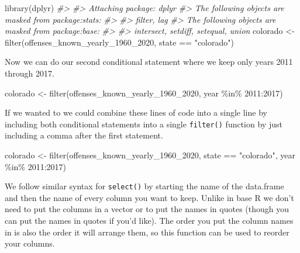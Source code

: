 \documentclass[
]{krantz}
\makeatletter
\newenvironment{Shaded}{\begin{snugshade}}{\end{snugshade}}
\newcommand{\CommentTok}[1]{\textcolor[rgb]{0.37,0.37,0.37}{\textit{#1}}}
\newcommand{\DecValTok}[1]{\textcolor[rgb]{0.06,0.06,0.06}{#1}}
\newcommand{\FunctionTok}[1]{\textcolor[rgb]{0,0,0}{#1}}
\newcommand{\NormalTok}[1]{#1}
\newcommand{\OtherTok}[1]{\textcolor[rgb]{0.37,0.37,0.37}{#1}}
\newcommand{\SpecialCharTok}[1]{\textcolor[rgb]{0,0,0}{#1}}
\newcommand{\StringTok}[1]{\textcolor[rgb]{0.5,0.5,0.5}{#1}}
\newenvironment{kframe}{%
\medskip{}
\setlength{\fboxsep}{.8em}
 \def\at@end@of@kframe{}%
 \ifinner\ifhmode%
  \def\at@end@of@kframe{\end{minipage}}%
  \begin{minipage}{\columnwidth}%
 \fi\fi%
 \def\FrameCommand##1{\hskip\@totalleftmargin \hskip-\fboxsep
 \colorbox{shadecolor}{##1}\hskip-\fboxsep
     \hskip-\linewidth \hskip-\@totalleftmargin \hskip\columnwidth}%
 \MakeFramed {\advance\hsize-\width
   \@totalleftmargin\z@ \linewidth\hsize
   \@setminipage}}%
 {\par\unskip\endMakeFramed%
 \at@end@of@kframe}
\renewenvironment{Shaded}{\begin{kframe}}{\end{kframe}}
\makeatother
\begin{document}
\begin{Shaded}
\begin{Highlighting}[]
\FunctionTok{library}\NormalTok{(dplyr)}
\CommentTok{\#\textgreater{} }
\CommentTok{\#\textgreater{} Attaching package: \textquotesingle{}dplyr\textquotesingle{}}
\CommentTok{\#\textgreater{} The following objects are masked from \textquotesingle{}package:stats\textquotesingle{}:}
\CommentTok{\#\textgreater{} }
\CommentTok{\#\textgreater{}     filter, lag}
\CommentTok{\#\textgreater{} The following objects are masked from \textquotesingle{}package:base\textquotesingle{}:}
\CommentTok{\#\textgreater{} }
\CommentTok{\#\textgreater{}     intersect, setdiff, setequal, union}
\NormalTok{colorado }\OtherTok{\textless{}{-}} \FunctionTok{filter}\NormalTok{(offenses\_known\_yearly\_1960\_2020, state }\SpecialCharTok{==} \StringTok{"colorado"}\NormalTok{)}
\end{Highlighting}
\end{Shaded}

Now we can do our second conditional statement where we keep only years 2011 through 2017.

\begin{Shaded}
\begin{Highlighting}[]
\NormalTok{colorado }\OtherTok{\textless{}{-}} \FunctionTok{filter}\NormalTok{(offenses\_known\_yearly\_1960\_2020, year }\SpecialCharTok{\%in\%} \DecValTok{2011}\SpecialCharTok{:}\DecValTok{2017}\NormalTok{)}
\end{Highlighting}
\end{Shaded}

If we wanted to we could combine these lines of code into a single line by including both conditional statements into a single \texttt{filter()} function by just including a comma after the first statement.

\begin{Shaded}
\begin{Highlighting}[]
\NormalTok{colorado }\OtherTok{\textless{}{-}} \FunctionTok{filter}\NormalTok{(offenses\_known\_yearly\_1960\_2020, state }\SpecialCharTok{==} \StringTok{"colorado"}\NormalTok{, year }\SpecialCharTok{\%in\%} \DecValTok{2011}\SpecialCharTok{:}\DecValTok{2017}\NormalTok{)}
\end{Highlighting}
\end{Shaded}

We follow similar syntax for \texttt{select()} by starting the name of the data.frame and then the name of every column you want to keep. Unlike in base R we don't need to put the columns in a vector or to put the names in quotes (though you can put the names in quotes if you'd like). The order you put the column names in is also the order it will arrange them, so this function can be used to reorder your columns.
\end{document}
